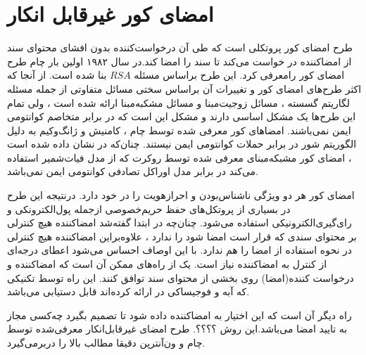 \documentclass[12pt,a4paper]{article}
\begin{document}
\section{امضای کور غیرقابل انکار}\label{undeniable_blind_sig}

طرح امضای کور پروتکلی است که طی آن درخواست‌کننده بدون افشای محتوای سند از امضاکننده در خواست می‌کند تا سند را امضا کند.در سال ۱۹۸۲ اولین بار چام طرح امضای کور رامعرفی کرد.
\cite{chaum@blind}
این طرح براساس مسئله 
$RSA$
بنا شده است.
\cite{rivest@rsa}
از آنجا که اکثر طرح‌های امضای کور و تغییرات آن براساس سختی مسائل متفاوتی از جمله مسئله لگاریتم گسسته
 ، مسائل زوجیت‌مبنا 
  و مسائل مشکبه‌مبنا
   ارائه شده است 
\cite{discrete@blind, lattice@blind, pairing@blind}
، ولی تمام این طرح‌ها یک مشکل اساسی دارند و مشکل این است که در برابر متخاصم کوانتومی ایمن نمی‌باشند. امضاهای کور معرفی شده توسط چام 
\cite{chaum@blind}
، کامنیش  
\cite{discrete@blind}
و ژانگ‌و‌کیم 
\cite{pairing@blind}
به دلیل الگوریتم شور 
 در برابر حملات کوانتومی ایمن نیستند.
چنان‌که در  
\cite{shamir@quantum}
نشان داده شده است ، امضای کور مشبکه‌مبنای معرفی شده توسط روکرت  
\cite{lattice@blind}
که از مدل فیات‌شمیر 
\cite{fiat@prove}
استفاده می‌کند در برابر مدل اوراکل تصادفی کوانتومی ایمن 
نمی‌باشد.

امضای کور هر دو ویژگی ناشناس‌بودن
 و احرازهویت 
 را در خود دارد.
\cite{untraceable, untraceability}
در‌نتیجه این طرح در بسیاری از پروتکل‌های حفظ حریم‌خصوصی 
ازجمله پول‌الکترونکی 
و رای‌گیری‌الکترونیکی
استفاده می‌شود.
\cite{e_vote@mobile, e_vot@net }
چنان‌چه در ابتدا گفته‌شد امضاکننده هیچ کنترلی بر محتوای سندی که قرار است امضا شود را ندارد ، علاوه‌بر‌این امضاکننده هیچ کنترلی در نحوه استفاده از امضا را هم ندارد. با این اوصاف احساس می‌شود اعطای درجه‌ای از کنترل به امضاکننده نیاز است. یک از راه‌های ممکن آن است که امضاکننده و درخواست کننده(امضا) روی بخشی از محتوای سند توافق کنند. این راه توسط تکنیکی که آبه و فوجیساکی در 
\cite{date@blind}
ارائه کرده‌اند قابل دستیابی می‌باشد.

راه دیگر آن است که این اختیار به امضاکننده داده شود تا تصمیم بگیرد چه‌کسی مجاز به تایید امضا می‌باشد.این روش ؟؟؟؟.
طرح امضای غیرقابل‌انکار معرفی‌شده توسط چام و ون‌آنترپن 
\cite{undeniable_chaum}
دقیقا مطالب بالا
 را دربرمی‌گیرد. 
 
\end{document}
